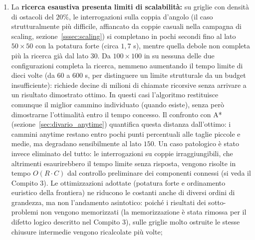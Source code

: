 \begin{enumerate}
    \item La \textbf{ricerca esaustiva presenta limiti di scalabilità:} su griglie con densità di ostacoli del $20\%$, le interrogazioni sulla coppia d'angolo (il caso strutturalmente più difficile, affiancato da coppie casuali nella campagna di scaling, sezione~\ref{sssec:scaling}) si completano in pochi secondi fino al lato $50\times50$ con la potatura forte (circa $1{,}7$ s), mentre quella debole non completa più la ricerca già dal lato $30$. Da $100\times100$ in su nessuna delle due configurazioni completa la ricerca, nemmeno aumentando il tempo limite di dieci volte (da $60$ a $600$ s, per distinguere un limite strutturale da un budget insufficiente): richiede decine di milioni di chiamate ricorsive senza arrivare a un risultato dimostrato ottimo. In questi casi l'algoritmo restituisce comunque il miglior cammino individuato (quando esiste), senza però dimostrarne l'ottimalità entro il tempo concesso. Il confronto con A* (sezione~\ref{sec:divario_anytime}) quantifica questa distanza dall'ottimo: i cammini anytime restano entro pochi punti percentuali alle taglie piccole e medie, ma degradano sensibilmente al lato $150$. Un caso patologico è stato invece eliminato del tutto: le interrogazioni su coppie irraggiungibili, che altrimenti esaurirebbero il tempo limite senza risposta, vengono risolte in tempo $O(R \cdot C)$ dal controllo preliminare dei componenti connessi (si veda il Compito 3). Le ottimizzazioni adottate (potatura forte e ordinamento euristico della frontiera) ne riducono le costanti anche di diversi ordini di grandezza, ma non l'andamento asintotico: poiché i risultati dei sotto-problemi non vengono memorizzati (la memorizzazione è stata rimossa per il difetto logico descritto nel Compito 3), sulle griglie molto ostruite le stesse chiusure intermedie vengono ricalcolate più volte;


\end{enumerate}
